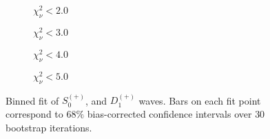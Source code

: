 \begin{figure}[htbp]
    \centering
    \begin{subfigure}{0.45\textwidth}
        
        \caption{$\chi^2_\nu < 2.0$}
    \end{subfigure}
    \hfill
    \begin{subfigure}{0.45\textwidth}
        
        \caption{$\chi^2_\nu < 3.0$}
    \end{subfigure}
    \vspace{1em}
    \begin{subfigure}{0.45\textwidth}
        
        \caption{$\chi^2_\nu < 4.0$}
    \end{subfigure}
    \hfill
    \begin{subfigure}{0.45\textwidth}
        
        \caption{$\chi^2_\nu < 5.0$}
    \end{subfigure}

    \caption{Binned fit of $S_{0}^{(+)}$, and $D_{1}^{(+)}$ waves. Bars on each fit point correspond to $68\%$ bias-corrected confidence intervals over $ 30 $ bootstrap iterations.}
    \label{fig:binned-fit-all-Sp-D1p}
\end{figure}

